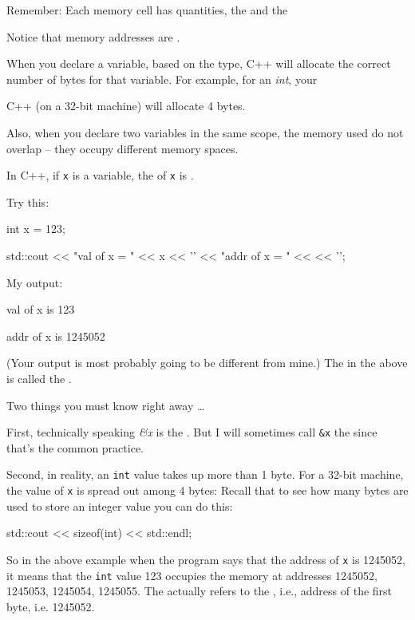 Remember: Each memory cell has  quantities, the  and the 

Notice that memory addresses are .

When you declare a variable, based on the type, C++ will allocate the correct number of bytes for that variable. For example, for an \emph{int}, your

C++ (on a 32-bit machine) will allocate 4 bytes.

Also, when you declare two variables in the same scope, the memory used do not overlap -- they occupy different memory spaces.

\newpage{}

In C++, if \verb!x! is a variable, the  of \verb!x! is .

Try this:

\begin{consolethree}[escapeinside=||]
int x = 123;

std::cout << "val of x = " << x << '\n'
          << "addr of x = " <<  << '\n';
\end{consolethree}

My output:

\begin{consolethree}[escapeinside=||]
val of x is 123

addr of x is 1245052
\end{consolethree}
(Your output is most probably going to be different from mine.) The \EMPHASIZE{\&} in the above is called the .

Two things you must know right away \ldots{}

First, technically speaking \emph{\&x} is the \emph{}\texttt{}. But I will sometimes call \texttt{\&x} the \texttt{} since that's the common practice.

Second, in reality, an \texttt{int} value takes up more than 1 byte. For a 32-bit machine, the value of \texttt{x} is spread out among 4 bytes: Recall that to see how many bytes are used to store an integer value you can do this:

\begin{consolethree}[escapeinside=||]
std::cout << sizeof(int) << std::endl;
\end{consolethree}
So in the above example when the program says that the address of \texttt{x} is 1245052, it means that the \texttt{int} value 123 occupies the memory at addresses 1245052, 1245053, 1245054, 1245055. The \texttt{} actually refers to the , i.e., address of the first byte, i.e. 1245052.

